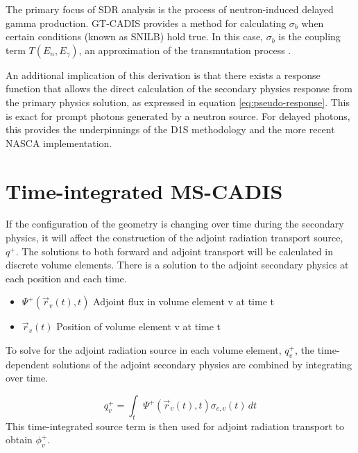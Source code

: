 The primary focus of SDR analysis
is the process of neutron-induced delayed gamma production. 
GT-CADIS provides a method for calculating $\sigma_b$ when
certain conditions (known as SNILB) hold true. In this case, $\sigma_b$ is the
coupling term $T(E_n,E_\gamma)$, an approximation of the transmutation
process \cite{gtcadis}.  

An additional implication of this derivation is that there exists a response
function that allows the direct calculation of the secondary physics response
from the primary physics solution, as expressed in
equation \ref{eq:pseudo-response}.  This is exact for prompt photons generated
by a neutron source.  For delayed photons, this provides the underpinnings of
the D1S methodology and the more recent NASCA implementation\cite{kit-nasca}.


\section{Time-integrated MS-CADIS}
If the configuration of the geometry is changing over time during
the secondary physics, it will affect the construction of the adjoint radiation
transport source, $q^{+}$.  
The solutions to both forward and adjoint transport will be calculated in discrete
volume elements. There is a solution to the adjoint secondary
physics at each position and each time.%
\begin{itemize}
	\item	{$ \Psi^{+}(\overrightarrow{r}_{v}(t), t)$ Adjoint flux in volume
		element v at time t}
	\item  {$\overrightarrow{r}_{v}(t)$ Position of volume element v at
		time t}
\end{itemize}
To solve for the adjoint radiation source in each volume element,
$q_{v}^{+}$, the time-dependent solutions of the 
adjoint secondary physics are combined by integrating over time.

 \begin{equation}\label{eq:adj_src_1_avg}
	 q_{v}^{+} =
	 \int_{t}  \Psi^{+}(\overrightarrow{r}_{v}(t), t)
	 \sigma_{c,v}(t)\, dt
 \end{equation}
This time-integrated source term is then used
for adjoint radiation transport to obtain $\phi_{v}^{+}$.

